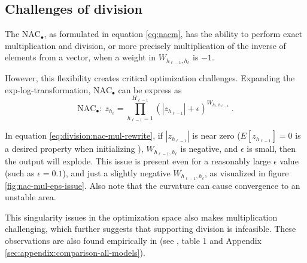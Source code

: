 \subsection{Challenges of division} \label{sssec:nac-mul}

The $\text{NAC}_{\bullet}$, as formulated in equation \ref{eq:nacm}, has the ability to perform exact multiplication and division, or more precisely multiplication of the inverse of elements from a vector, when a weight in $W_{h_{\ell-1},h_\ell}$ is $-1$.

However, this flexibility creates critical optimization challenges. Expanding the exp-log-transformation, $\text{NAC}_{\bullet}$ can be express as
\begin{equation}
\textrm{NAC}_\bullet:\ z_{h_\ell} = \prod_{h_{\ell-1}=1}^{H_{\ell-1}} (|z_{h_{\ell-1}}| + \epsilon)^{W_{h_{\ell}, h_{\ell-1}}}\ .
\label{eq:division:nac-mul-rewrite}
\end{equation}

In equation \eqref{eq:division:nac-mul-rewrite}, if $|z_{h_{\ell-1}}|$ is near zero ($E[z_{h_{\ell-1}}] = 0$ is a desired property when initializing \cite{glorot-initialization}), $W_{h_{\ell-1},h_\ell}$ is negative, and $\epsilon$ is small, then the output will explode. This issue is present even for a reasonably large $\epsilon$ value (such as $\epsilon = 0.1$), and just a slightly negative $W_{h_{\ell-1},h_\ell}$, as visualized in figure \ref{fig:nac-mul-eps-issue}. Also note that the curvature can cause convergence to an unstable area.

This singularity issues in the optimization space also makes multiplication challenging, which further suggests that supporting division is infeasible. These observations are also found empirically in (see \citet{trask-nalu}, table 1 and Appendix \ref{sec:appendix:comparison-all-models}).


